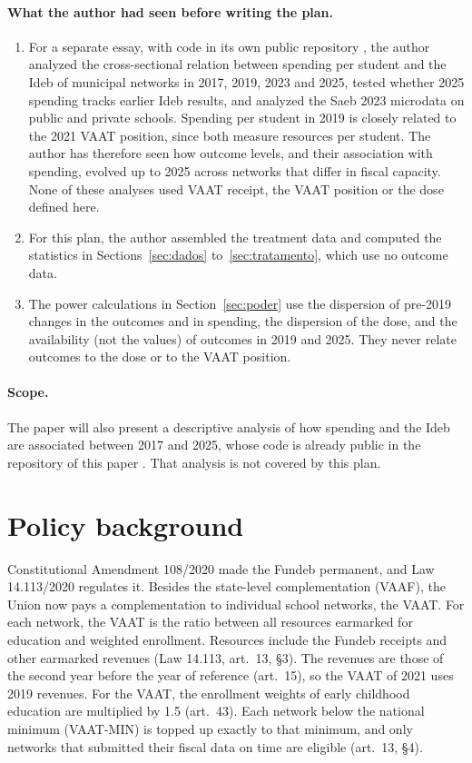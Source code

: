 \documentclass[11pt]{article}
\begin{document}
\paragraph{What the author had seen before writing the plan.}
\begin{enumerate}[label=(\alph*)]
\item For a separate essay, with code in its own public repository \citep{cunha2026b}, the author analyzed the cross-sectional relation between spending per student and the Ideb of municipal networks in 2017, 2019, 2023 and 2025, tested whether 2025 spending tracks earlier Ideb results, and analyzed the Saeb 2023 microdata on public and private schools. Spending per student in 2019 is closely related to the 2021 VAAT position, since both measure resources per student. The author has therefore seen how outcome levels, and their association with spending, evolved up to 2025 across networks that differ in fiscal capacity. None of these analyses used VAAT receipt, the VAAT position or the dose defined here.
\item For this plan, the author assembled the treatment data and computed the statistics in Sections~\ref{sec:dados} to~\ref{sec:tratamento}, which use no outcome data.
\item The power calculations in Section~\ref{sec:poder} use the dispersion of pre-2019 changes in the outcomes and in spending, the dispersion of the dose, and the availability (not the values) of outcomes in 2019 and 2025. They never relate outcomes to the dose or to the VAAT position.
\end{enumerate}

\paragraph{Scope.} The paper will also present a descriptive analysis of how spending and the Ideb are associated between 2017 and 2025, whose code is already public in the repository of this paper \citep{cunha2026a}. That analysis is not covered by this plan.

\section{Policy background}\label{sec:politica}

Constitutional Amendment 108/2020 made the Fundeb permanent, and Law 14.113/2020 regulates it. Besides the state-level complementation (VAAF), the Union now pays a complementation to individual school networks, the VAAT. For each network, the VAAT is the ratio between all resources earmarked for education and weighted enrollment. Resources include the Fundeb receipts and other earmarked revenues (Law 14.113, art.~13, \S3). The revenues are those of the second year before the year of reference (art.~15), so the VAAT of 2021 uses 2019 revenues. For the VAAT, the enrollment weights of early childhood education are multiplied by 1.5 (art.~43). Each network below the national minimum (VAAT-MIN) is topped up exactly to that minimum, and only networks that submitted their fiscal data on time are eligible (art.~13, \S4).
\end{document}
